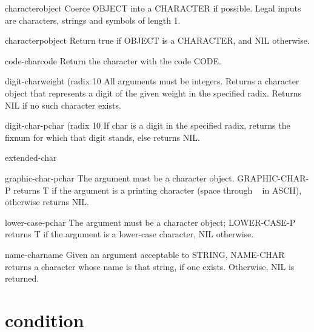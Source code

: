 \begin{class}{character}{object}{}
  Coerce OBJECT into a CHARACTER if possible. Legal inputs are
  characters, strings and symbols of length 1.
\end{class}

\begin{function}{characterp}{object}{}
  Return true if OBJECT is a CHARACTER, and NIL otherwise.
\end{function}

\begin{function}{code-char}{code}{}
  Return the character with the code CODE.
\end{function}

\begin{function}{digit-char}{weight \op (radix 10}{}
  All arguments must be integers. Returns a character object that
  represents a digit of the given weight in the specified radix. Returns
  NIL if no such character exists.
\end{function}

\begin{function}{digit-char-p}{char \op (radix 10}{}
  If char is a digit in the specified radix, returns the fixnum for
  which that digit stands, else returns NIL.
\end{function}

\begin{type}{extended-char}{}{}
  
\end{type}

\begin{function}{graphic-char-p}{char}{}
  The argument must be a character object. GRAPHIC-CHAR-P returns T if the
  argument is a printing character (space through ~ in ASCII), otherwise
  returns NIL.
\end{function}

\begin{function}{lower-case-p}{char}{}
  The argument must be a character object; LOWER-CASE-P returns T if the
   argument is a lower-case character, NIL otherwise.
\end{function}

\begin{function}{name-char}{name}{}
  Given an argument acceptable to STRING, NAME-CHAR returns a character
  whose name is that string, if one exists. Otherwise, NIL is returned.
\end{function}

\section{condition}

